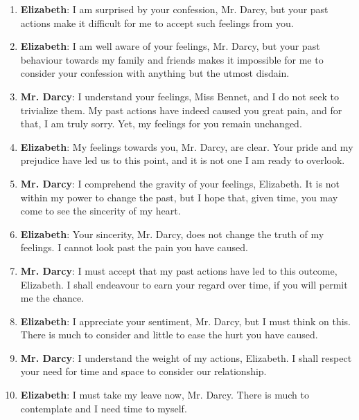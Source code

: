 \documentclass[10pt]{article}
\begin{document}
\begin{enumerate}
\item \textbf{Elizabeth}: I am surprised by your confession, Mr. Darcy, but your past actions make it difficult for me to accept such feelings from you.

\item \textbf{Elizabeth}: I am well aware of your feelings, Mr. Darcy, but your past behaviour towards my family and friends makes it impossible for me to consider your confession with anything but the utmost disdain.

\item \textbf{Mr. Darcy}: I understand your feelings, Miss Bennet, and I do not seek to trivialize them. My past actions have indeed caused you great pain, and for that, I am truly sorry. Yet, my feelings for you remain unchanged.

\item \textbf{Elizabeth}: My feelings towards you, Mr. Darcy, are clear. Your pride and my prejudice have led us to this point, and it is not one I am ready to overlook.

\item \textbf{Mr. Darcy}: I comprehend the gravity of your feelings, Elizabeth. It is not within my power to change the past, but I hope that, given time, you may come to see the sincerity of my heart.

\item \textbf{Elizabeth}: Your sincerity, Mr. Darcy, does not change the truth of my feelings. I cannot look past the pain you have caused.

\item \textbf{Mr. Darcy}: I must accept that my past actions have led to this outcome, Elizabeth. I shall endeavour to earn your regard over time, if you will permit me the chance.

\item \textbf{Elizabeth}: I appreciate your sentiment, Mr. Darcy, but I must think on this. There is much to consider and little to ease the hurt you have caused.

\item \textbf{Mr. Darcy}: I understand the weight of my actions, Elizabeth. I shall respect your need for time and space to consider our relationship.

\item \textbf{Elizabeth}: I must take my leave now, Mr. Darcy. There is much to contemplate and I need time to myself.

\end{enumerate}
\end{document}
